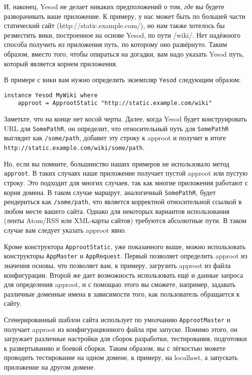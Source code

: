 И, наконец, Yesod не делает никаких предположений о том, \emph{где} вы будете разворачивать ваше приложение. К примеру, у нас может быть по большей части статический сайт (http://static.example.com/), но нам также хотелось бы резместить вики, построенное на основе Yesod, по пути /wiki/. Нет надёжного способа получить из приложения путь, по которому оно развёрнуто. Таким образом, вместо того, чтобы опираться на догадки, вам надо указать Yesod путь, который является корнем приложения.

В примере с вики вам нужно определить экземпляр \lstinline!Yesod! следующим образом:

\begin{lstlisting}
instance Yesod MyWiki where
    approot = ApprootStatic "http://static.example.com/wiki"
\end{lstlisting}

Заметьте, что на конце нет косой черты. Далее, когда Yesod будет конструировать URL для \lstinline!SomePathR!, он определит, что относительный путь для \lstinline!SomePathR! выглядит как \lstinline!/some/path!, добавит эту строку к approot и получит в итоге \lstinline!http://static.example.com/wiki/some/path!.

Но, если вы помните, большинство наших примеров не использовало метод \lstinline!approot!. В таких случаях наше приложение получает пустой approot или пустую строку. Это подходит для многих случаев, так как многие приложения работают с корня домена. В таком случае маршрут, аналогичный \lstinline!SomePathR!, будет рендериться как \lstinline!/some/path!, что является корректной относительной ссылкой в любом месте вашего сайта. Однако для некоторых вариантов использования (ленты Atom/RSS или XML-карты сайтов) требуются абсолютные пути. В таком случае вам следует указать approot явно.

Кроме конструктора \lstinline!ApprootStatic!, уже показанного выше, можно использовать конструкторы \lstinline!AppMaster! и \lstinline!AppRequest!. Первый позволяет определить approot из значения основы, что позволяет вам, к примеру, загрузить approot из файла конфигурации. Второй же дает возможность использовать ещё и данные запроса для определения approot, и с помощью этого вы сможете, например, задавать различные доменные имена в зависимости того, как пользователь обращается к сайту.

Сгенерированный шаблон сайта использует по умолчанию \lstinline!ApprootMaster! и получает approot из конфигурационного файла при запуске. Помимо этого, он загружает различные настройки для сборок разработки, тестирования, подготовки к развертыванию и боевой сборки. Таким образом, вы с лёгкостью можете проводить тестирование на одном домене, к примеру, на localhost, а запускать приложение на другом домене.

